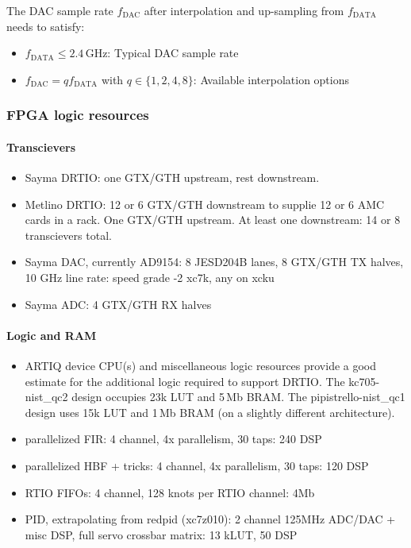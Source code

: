 \documentclass[11pt]{paper}
\begin{document}
The DAC sample rate $f_\mathrm{DAC}$ after interpolation and up-sampling from $f_\mathrm{DATA}$ needs to satisfy:

\begin{itemize}
   \item $f_\mathrm{DATA} \leq 2.4\,\mathrm{GHz}$: Typical DAC sample rate
   \item $f_\mathrm{DAC} = q f_\mathrm{DATA}$ with $q \in \{1, 2, 4, 8\}$: Available interpolation options
\end{itemize}

\subsubsection{FPGA logic resources}

\paragraph{Transcievers}

\begin{itemize}
   \item Sayma DRTIO: one GTX/GTH upstream, rest downstream.
   \item Metlino DRTIO: 12 or 6 GTX/GTH downstream to supplie 12 or 6 AMC cards in a rack. One GTX/GTH upstream. At least one downstream: 14 or 8 transcievers total.
   \item Sayma DAC, currently AD9154: 8 JESD204B lanes, 8 GTX/GTH TX halves, 10 GHz line rate: speed grade -2 xc7k, any on xcku
   \item Sayma ADC: 4 GTX/GTH RX halves
\end{itemize}

\paragraph{Logic and RAM}

\begin{itemize}
   \item ARTIQ device CPU(s) and miscellaneous logic resources provide a good  estimate for the additional logic required to support DRTIO.
      The kc705-nist\_qc2 design occupies 23k LUT and 5\,Mb BRAM.
      The pipistrello-nist\_qc1 design uses 15k LUT and 1\,Mb BRAM (on a slightly different architecture).
    \item parallelized FIR: 4 channel, 4x parallelism, 30 taps: 240 DSP
    \item parallelized HBF + tricks: 4 channel, 4x parallelism, 30 taps: 120 DSP
    \item RTIO FIFOs: 4 channel, 128 knots per RTIO channel: 4Mb
   \item PID, extrapolating from redpid (xc7z010): 2 channel 125MHz ADC/DAC + misc DSP, full servo crossbar matrix: 13 kLUT, 50 DSP
\end{itemize}
\end{document}
